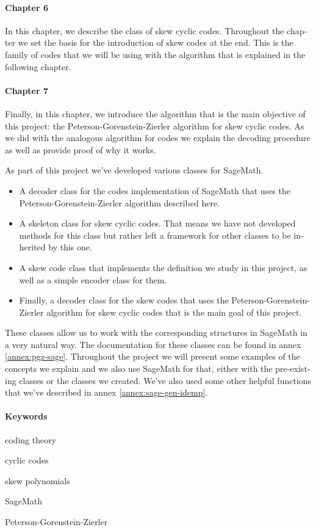 \begin{otherlanguage}{english}
\paragraph{Chapter 6} In this chapter, we describe the class of skew cyclic codes.
Throughout the chapter we set the basis for the introduction of skew  codes at the end.
This is the family of codes that we will be using with the algorithm that is explained in the following chapter.

\paragraph{Chapter 7} Finally, in this chapter, we introduce the algorithm that is the main objective of this project: the Peterson-Gorenstein-Zierler algorithm for skew cyclic codes.
As we did with the analogous algorithm for  codes we explain the decoding procedure as well as provide proof of why it works.

As part of this project we've developed various classes for SageMath.
\begin{itemize}
  \item A decoder class for the  codes implementation of SageMath that uses the Peterson-Gorenstein-Zierler algorithm described here.
  \item A skeleton class for skew cyclic codes. That means we have not developed methods for this class but rather left a framework for other classes to be inherited by this one.
  \item A skew  code class that implements the definition we study in this project, as well as a simple encoder class for them.
  \item Finally, a decoder class for the skew  codes that uses the Peterson-Gorenstein-Zierler algorithm for skew cyclic codes that is the main goal of this project.
\end{itemize}

These classes allow us to work with the corresponding structures in SageMath in a very natural way.
The documentation for these classes can be found in annex \ref{annex:pgz-sage}.
Throughout the project we will present some examples of the concepts we explain and we also use SageMath for that, either with the pre-existing classes or the classes we created.
We've also used some other helpful functions that we've described in annex \ref{annex:sage-gen-idemp}.

\paragraph{Keywords}
\begin{itemize*}[label=,itemsep=4em,itemjoin=\hspace{2em}]
  \item coding theory
  \item cyclic codes 
  \item skew polynomials
  \item SageMath
  \item Peterson-Gorenstein-Zierler
\end{itemize*}

\end{otherlanguage}